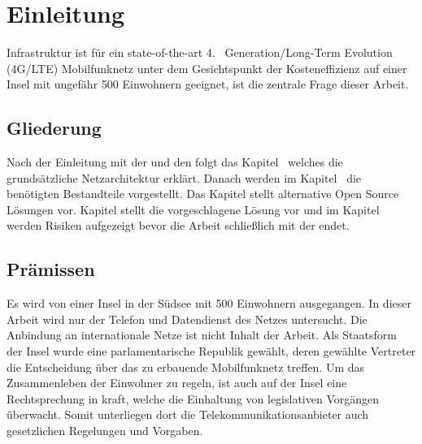 
%
%
% 
% 
% 

\section{Einleitung}
\label{sec:einleitung}
 Infrastruktur ist für ein state-of-the-art  4.~ Generation/Long-Term Evolution (4G/LTE)  Mobilfunknetz unter dem Gesichtspunkt der Kosteneffizienz auf einer Insel mit ungefähr 500 Einwohnern geeignet, ist die zentrale Frage dieser Arbeit.
\subsection{Gliederung}
\label{subsec:gliederung}
Nach der Einleitung mit der  und den  folgt das Kapitel~ welches die grundsätzliche Netzarchitektur erklärt. Danach werden im Kapitel~ die benötigten Bestandteile vorgestellt. Das Kapitel  stellt alternative Open Source Lösungen vor. Kapitel  stellt die vorgeschlagene Lösung vor und im Kapitel  werden Risiken aufgezeigt bevor die Arbeit schließlich mit der  endet.
\subsection{Prämissen}
\label{subsec:praemissen}
Es wird von einer Insel in der Südsee mit 500 Einwohnern ausgegangen. In dieser Arbeit wird nur der Telefon und Datendienst des Netzes untersucht. Die Anbindung an internationale Netze ist nicht Inhalt der Arbeit. Als Staatsform der Insel wurde eine parlamentarische Republik gewählt, deren gewählte Vertreter die Entscheidung über das zu erbauende Mobilfunknetz treffen. Um das Zusammenleben der Einwohner zu regeln, ist auch auf der Insel eine Rechtsprechung in kraft, welche die Einhaltung von legislativen Vorgängen überwacht. Somit unterliegen dort die Telekommunikationsanbieter auch gesetzlichen Regelungen und Vorgaben.

